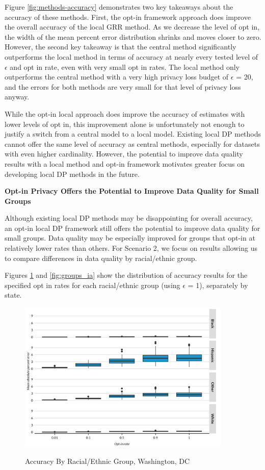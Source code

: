\documentclass[
]{urban-formatting}
\begin{document}
Figure \ref{fig:methods-accuracy} demonstrates two key takeaways about
the accuracy of these methods. First, the opt-in framework approach does
improve the overall accuracy of the local GRR method. As we decrease the
level of opt in, the width of the mean percent error distribution
shrinks and moves closer to zero. However, the second key takeaway is
that the central method significantly outperforms the local method in
terms of accuracy at nearly every tested level of \(\epsilon\) and opt
in rate, even with very small opt in rates. The local method only
outperforms the central method with a very high privacy loss budget of
\(\epsilon\) = 20, and the errors for both methods are very small for
that level of privacy loss anyway.~

While the opt-in local approach does improve the accuracy of estimates
with lower levels of opt in, this improvement alone is unfortunately not
enough to justify a switch from a central model to a local model.
Existing local DP methods cannot offer the same level of accuracy as
central methods, especially for datasets with even higher cardinality.
However, the potential to improve data quality results with a local
method and opt-in framework motivates greater focus on developing local
DP methods in the future.~

\textbf{Opt-in Privacy Offers the Potential to Improve Data Quality for
Small Groups}

Although existing local DP methods may be disappointing for overall
accuracy, an opt-in local DP framework still offers the potential to
improve data quality for small groups. Data quality may be especially
improved for groups that opt-in at relatively lower rates than others.
For Scenario 2, we focus on results allowing us to compare differences
in data quality by racial/ethnic group.~

Figures \ref{fig:groups_dc} and \ref{fig:groups_ia} show the
distribution of accuracy results for the specified opt in rates for each
racial/ethnic group (using \(\epsilon\) = 1), separately by state.

\begin{figure}[!htb]
    \centering
    \caption{Accuracy By Racial/Ethnic Group, Washington, DC}
    \includegraphics[width=4in]{../figures/groups_dc.png}
    \label{fig:groups_dc}
\end{figure}
\end{document}
